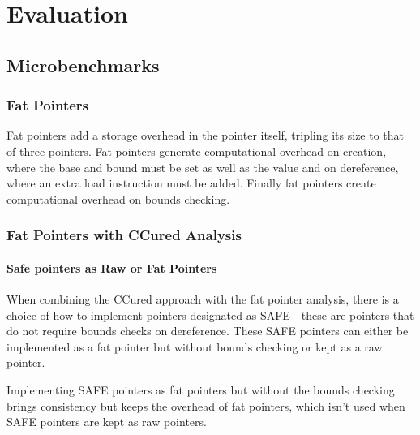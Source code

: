 \chapter{Evaluation}

\section{Microbenchmarks}

\subsection{Fat Pointers}

Fat pointers add a storage overhead in the pointer itself, tripling its size to that of three pointers. Fat pointers generate computational overhead on creation, where the base and bound must be set as well as the value and on dereference, where an extra load instruction must be added. Finally fat pointers create computational overhead on bounds checking.

\subsection{Fat Pointers with CCured Analysis}

\subsubsection{Safe pointers as Raw or Fat Pointers}

When combining the CCured approach with the fat pointer analysis, there is a choice of how to implement pointers designated as SAFE - these are pointers that do not require bounds checks on dereference. These SAFE pointers can either be implemented as a fat pointer but without bounds checking or kept as a raw pointer.

Implementing SAFE pointers as fat pointers but without the bounds checking brings consistency but keeps the overhead of fat pointers, which isn't used when SAFE pointers are kept as raw pointers.

